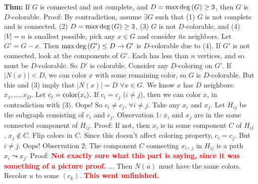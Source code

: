\documentclass[10pt,letterpaper]{article}
\newcommand{\n}{\hfill\break}
\newcommand{\thm}[1]{\par\noindent\settowidth{\hangindent}{\textbf{Thm: }}\textbf{Thm: }#1\n}
\newcommand{\ptxt}[1]{\textrm{\textnormal{#1}}}
\newcommand{\card}[1]{\left|#1\right|}
\renewcommand{\deg}[1]{\ptxt{deg}\left(#1\right)}
\newcommand{\flag}[1]{\textbf{\textcolor{red}{#1}}}
\begin{document}
\thm{If $G$ is connected and not complete, and $D=\max\deg{G}\ge{}3$, then $G$ is $D$-colorable.\n
Proof: By contradiction, assume $\exists{}G$ such that\n
(1) $G$ is not complete and is connected,
(2) $D=\max\deg{G}\ge{}3$,\n
(3) $G$ is not $D$-colorable, and\n
(4) $\card{V}=n$ is smallest possible,\n
\n
pick any $x\in{}G$ and consider its neighbors. Let $G'=G-x$.\n
Then $\max\deg{G'}\le{}D\to{}G'$ is $D$-colorable due to (4).\n
If $G'$ is not connected, look at the components of $G'$. Each has less than $n$ vertices, and so must be $D$-colorable. So $D'$ is colorable.\n
Consider any $D$-coloring on $G'$. If $\card{N(x)}<D$, we can color $x$ with some remaining color, so $G$ is $D$-colorable. But this and (3) imply that $\card{N(x)}=D$ $\forall{}x\in{}G$.\n
\n
We know $x$ has $D$ neighbors: $x_{1},\ldots,x_{D}$. Let $c_{i}=\ptxt{color}(x_{i})$. If $c_{i}=c_{j}$ ($i\ne{}j$), then we can color $x$, in contradiction with (3). Oops!\n
So $c_{i}\ne{}c_{j}$, $\forall{}i\ne{}j$. Take any $x_{i}$ and $x_{j}$. Let $H_{ij}$ be the subgraph consisting of $c_{i}$ and $c_{j}$.\n
Observation 1: $x_{i}$ and $x_{j}$ are in the same connected component of $H_{ij}$.\n
Proof: If not, then $x_{i}$ is in some component $C$ of $H_{ij}$, $x_{j}\not\in{}C$. Flip colors in $C$. Since this doesn't affect coloring property, $c_{i}=c_{j}$. But $i\ne{}j$. Oops!\n
Observation 2: The component $C$ connecting $x_{i}$, $_{j}$ in $H_{ij}$ is a path $x_{i}\leadsto{}x_{j}$.\n
Proof: \flag{Not exactly sure what this part is saying, since it was something of a picture proof.}\n
...\n
Then $N(u)$ must have the same colors. Recolor $u$ to some $(c_{k})$.\n
\flag{This went unfinished.}}
\end{document}
